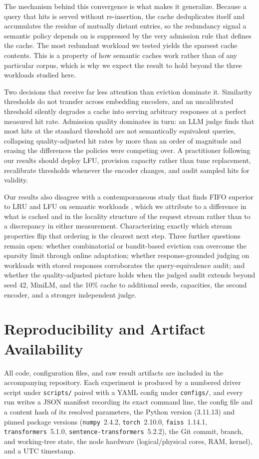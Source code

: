 \documentclass[sigconf,nonacm]{acmart}
\begin{document}
The mechanism behind this convergence is what makes it generalize. Because a query that hits is served without re-insertion, the cache deduplicates itself and accumulates the residue of mutually distant entries, so the redundancy signal a semantic policy depends on is suppressed by the very admission rule that defines the cache. The most redundant workload we tested yields the sparsest cache contents. This is a property of how semantic caches work rather than of any particular corpus, which is why we expect the result to hold beyond the three workloads studied here.

Two decisions that receive far less attention than eviction dominate it. Similarity thresholds do not transfer across embedding encoders, and an uncalibrated threshold silently degrades a cache into serving arbitrary responses at a perfect measured hit rate. Admission quality dominates in turn: an LLM judge finds that most hits at the standard threshold are not semantically equivalent queries, collapsing quality-adjusted hit rates by more than an order of magnitude and erasing the differences the policies were competing over. A practitioner following our results should deploy LFU, provision capacity rather than tune replacement, recalibrate thresholds whenever the encoder changes, and audit sampled hits for validity.

Our results also disagree with a contemporaneous study that finds FIFO superior to LRU and LFU on semantic workloads \cite{sun2026solar}, which we attribute to a difference in what is cached and in the locality structure of the request stream rather than to a discrepancy in either measurement. Characterizing exactly which stream properties flip that ordering is the clearest next step. Three further questions remain open: whether combinatorial or bandit-based eviction \cite{liu2026semantic} can overcome the sparsity limit through online adaptation; whether response-grounded judging on workloads with stored responses corroborates the query-equivalence audit; and whether the quality-adjusted picture holds when the judged audit extends beyond seed 42, MiniLM, and the 10\% cache to additional seeds, capacities, the second encoder, and a stronger independent judge.
\section{Reproducibility and Artifact Availability}
All code, configuration files, and raw result artifacts are included in the accompanying repository. Each experiment is produced by a numbered driver script under \texttt{scripts/} paired with a YAML config under \texttt{configs/}, and every run writes a JSON manifest recording its exact command line, the config file and a content hash of its resolved parameters, the Python version (3.11.13) and pinned package versions (\texttt{numpy}~2.4.2, \texttt{torch}~2.10.0, \texttt{faiss}~1.14.1, \texttt{transformers}~5.1.0, \texttt{sentence-transformers}~5.2.2), the Git commit, branch, and working-tree state, the node hardware (logical/physical cores, RAM, kernel), and a UTC timestamp.
\end{document}
